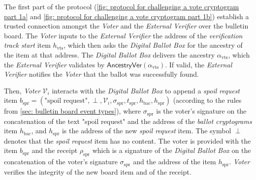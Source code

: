 The first part of the protocol (\cref{fig: protocol for challenging a vote cryptogram part 1a} and \cref{fig: protocol for challenging a vote cryptogram part 1b}) establish a trusted connection amongst the \textit{Voter} and the \textit{External Verifier} over the bulletin board. The \textit{Voter} inputs to the \textit{External Verifier} the address of the \textit{verification track start} item $h_\mathrm{vts}$, which then asks the \textit{Digital Ballot Box} for the ancestry of the item at that address. The \textit{Digital Ballot Box} delivers the ancestry $\alpha_\mathrm{vts}$, which the \textit{External Verifier} validates by $\mathsf{AncestryVer}(\alpha_\mathrm{vts})$. If valid, the \textit{External Verifier} notifies the \textit{Voter} that the ballot was successfully found.

Then, \textit{Voter} $\mathcal{V}_i$ interacts with the \textit{Digital Ballot Box} to append a \textit{spoil request} item $b_\mathrm{spr} = (\text{"spoil request"}, \perp, \mathcal{V}_i, \sigma_\mathrm{spr}, t_\mathrm{spr}, h_\mathrm{bac}, h_\mathrm{spr})$ (according to the rules from \cref{sec: bulletin board event types}), where $\sigma_\mathrm{spr}$ is the voter's signature on the concatenation of the text "spoil request" and the address of the \textit{ballot cryptograms} item $h_\mathrm{bac}$, and $h_\mathrm{spr}$ is the address of the new \textit{spoil request} item. The symbol $\perp$ denotes that the \textit{spoil request} item has no content. The voter is provided with the item $b_\mathrm{spr}$ and the receipt $\rho_\mathrm{spr}$ which is a signature of the \textit{Digital Ballot Box} on the concatenation of the voter's signature $\sigma_\mathrm{spr}$ and the address of the item $h_\mathrm{spr}$. \textit{Voter} verifies the integrity of the new board item and of the receipt.

